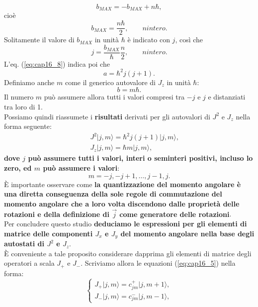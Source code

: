 \documentclass[a4paper,12pt,oneside]{book}
\begin{document}
\begin{equation}
b_{MAX}=-b_{MAX}+n\hbar, 
\end{equation}
cioè
\begin{equation}
b_{MAX}=\frac{n\hbar}{2}, \qquad n intero.
\end{equation}
Solitamente il valore di $b_{MAX}$ in unità $\hbar$ è indicato con $j$, così che
\begin{equation}
j= \frac{b_{MAX}}{\hbar} \frac{n}{2}, \qquad n intero.
\end{equation}
L'eq. (\ref{eq:cap16_8}) indica poi che
\begin{equation}
a= \hbar ^2 j(j+1).
\end{equation}
Definiamo anche $m$ come il generico autovalore di $J_z$ in unità $\hbar$:
\begin{equation}
b=m\hbar .
\end{equation}
Il numero $m$ può assumere allora tutti i valori compresi tra $-j$ e $j$ e distanziati tra loro di 1.\\
Possiamo quindi riassumete i \textbf{risultati} derivati per gli autovalori di $J^2$ e $J_z$ nella forma seguente:
\begin{eqnarray}
& &J^2\vert j, m \rangle =\hbar ^2 j (j+1)\vert j, m \rangle , \\
& &J_z\vert j, m \rangle =\hbar  m\vert j, m \rangle ,
\end{eqnarray}
\textbf{dove $j$ può assumere tutti i valori, interi o seminteri positivi, incluso  lo zero, ed $m$ può assumere i valori}:
\begin{equation}
m=-j, -j+1,\dots , j-1, j.
\end{equation}
È importante osservare come \textbf{la quantizzazione del momento angolare è una diretta conseguenza della sole regole di commutazione del momento  angolare che a loro volta discendono dalle proprietà delle rotazioni e della definizione di $\vec{j}$ come generatore delle rotazioni}.\\
Per concludere questo studio \textbf{deduciamo le espressioni per gli elementi di matrice delle componenti $J_x$ e $J_y$ del momento angolare nella base degli autostati di $J^2$ e $J_z$}.\\
È conveniente a tale proposito considerare dapprima gli elementi di matrice degli operatori a scala $J_+$ e $J_-$. Scriviamo allora le equazioni (\ref{eq:cap16_5}) nella forma:
\begin{equation}
\begin{cases}
J_+\vert j, m \rangle = c_{jm} ^+\vert j, m+1 \rangle , \\
J_-\vert j, m \rangle = c_{jm} ^-\vert j, m-1 \rangle ,
\end{cases}
\end{equation}
\end{document}
